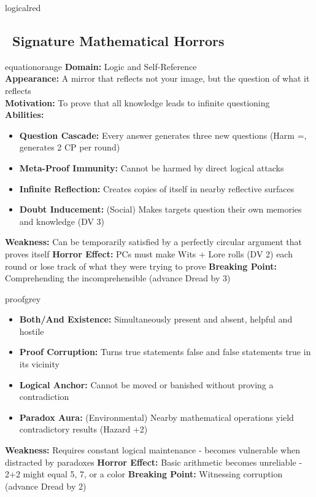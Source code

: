 \documentclass[11pt]{article}
\begin{document}
\begin{campaignsection}{logicalred}
\subsection*{\faDragon\ Signature Mathematical Horrors}

\begin{npcbox}{equationorange}
\textbf{Domain:} Logic and Self-Reference \\
\textbf{Appearance:} A mirror that reflects not your image, but the question of what it reflects \\
\textbf{Motivation:} To prove that all knowledge leads to infinite questioning \\
\textbf{Abilities:} 
\begin{itemize}
    \item \textbf{Question Cascade:} Every answer generates three new questions (Harm =, generates 2 CP per round)
    \item \textbf{Meta-Proof Immunity:} Cannot be harmed by direct logical attacks
    \item \textbf{Infinite Reflection:} Creates copies of itself in nearby reflective surfaces
    \item \textbf{Doubt Inducement:} (Social) Makes targets question their own memories and knowledge (DV 3)
\end{itemize}
\textbf{Weakness:} Can be temporarily satisfied by a perfectly circular argument that proves itself
\textbf{Horror Effect:} PCs must make Wits + Lore rolls (DV 2) each round or lose track of what they were trying to prove
\textbf{Breaking Point:} Comprehending the incomprehensible (advance Dread by 3)
\end{npcbox}

\begin{npcbox}{proofgrey}
\begin{itemize}
    \item \textbf{Both/And Existence:} Simultaneously present and absent, helpful and hostile
    \item \textbf{Proof Corruption:} Turns true statements false and false statements true in its vicinity
    \item \textbf{Logical Anchor:} Cannot be moved or banished without proving a contradiction
    \item \textbf{Paradox Aura:} (Environmental) Nearby mathematical operations yield contradictory results (Hazard +2)
\end{itemize}
\textbf{Weakness:} Requires constant logical maintenance - becomes vulnerable when distracted by paradoxes
\textbf{Horror Effect:} Basic arithmetic becomes unreliable - 2+2 might equal 5, 7, or a color
\textbf{Breaking Point:} Witnessing corruption (advance Dread by 2)
\end{npcbox}


\end{campaignsection}
\end{document}
